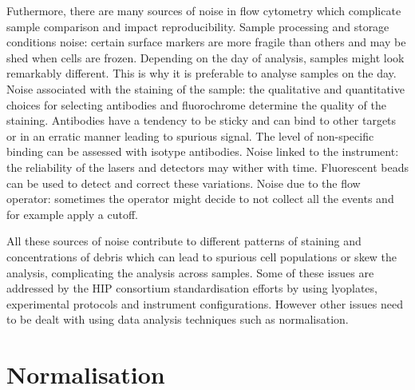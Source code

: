 Futhermore, there are many sources of noise in flow cytometry which complicate sample comparison and impact reproducibility.  
Sample processing and storage conditions noise:
certain surface markers are more fragile than others and may be shed when cells are frozen.
Depending on the day of analysis, samples might look remarkably different.
This is why it is preferable to analyse samples on the day.  
Noise associated with the staining of the sample:
the qualitative and quantitative choices for selecting antibodies and fluorochrome determine the quality of the staining.
Antibodies have a tendency to be sticky and can bind to other targets or in an erratic manner leading to spurious signal.
The level of non-specific binding can be assessed with isotype antibodies.  
Noise linked to the instrument:
the reliability of the lasers and detectors may wither with time.
Fluorescent beads can be used to detect and correct these variations.  
Noise due to the flow operator:
sometimes the operator might decide to not collect all the events and for example apply a cutoff.

All these sources of noise contribute to different patterns of staining and concentrations of debris
which can lead to spurious cell populations or skew the analysis, complicating the analysis across samples.
Some of these issues are addressed by the \gls{HIP} consortium standardisation efforts \citep{Maecker:2012gl}
by using lyoplates, experimental protocols and instrument configurations.
However other issues need to be dealt with using data analysis techniques such as normalisation.

\section{Normalisation}

